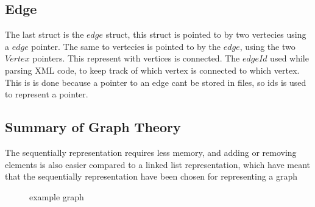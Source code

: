 \begin{minipage}{\linewidth}
\subsection{Edge}
The last struct is the $edge$ struct, this struct is pointed to by two vertecies using a $edge$ pointer. The same to vertecies is pointed to by the $edge$, using the two $Vertex$ pointers. This represent with vertices is connected.
The $edgeId$ used while parsing XML code, to keep track of which vertex is connected to which vertex.
This is is done because a pointer to an edge cant be stored in files, so ids is used to represent a pointer. 
 \label{edge_struct}
\end{minipage}


\subsection{Summary of Graph Theory}

The sequentially representation requires less memory, and adding or removing elements is also easier compared to a linked list representation, which have meant that the sequentially representation  have been chosen for representing a graph 


\begin{figure}[h]
\centering
{}
\caption{example graph} \label{fig:examplegraph}
\end{figure}